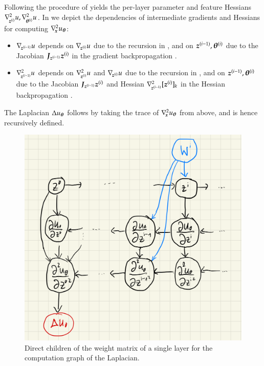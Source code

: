 Following the procedure of  yields the
per-layer parameter and feature Hessians $\nabla_{\!{{\boldsymbol{z}}^{(i)}}}^{2}u,
\nabla_{\!{{\boldsymbol{\theta}}^{(i)}}}^{2}u$. In  we depict the dependencies of
intermediate gradients and Hessians for computing $\nabla_{\!{{\boldsymbol{x}}}}^{2}u_{{\boldsymbol{\theta}}}$:
\begin{itemize}
\item $\nabla_{\!{{\boldsymbol{z}}^{(i-1)}}}u$ depends on $\nabla_{\!{{\boldsymbol{z}}^{(i)}}}u$ due to the recursion in , and on ${\boldsymbol{z}}^{(i-1)}, {\boldsymbol{\theta}}^{(i)}$ due to the Jacobian ${\boldsymbol{J}}_{{\boldsymbol{z}}^{(i-1)}}{\boldsymbol{z}}^{(i)}$ in the gradient backpropagation .

\item $\nabla_{\!{{\boldsymbol{z}}^{(i-1)}}}^{2}u$ depends on $\nabla_{\!{{\boldsymbol{z}}^{(i)}}}^{2}u$ and $\nabla_{\!{{\boldsymbol{z}}^{(i)}}} u$ due to the recursion in , and on ${\boldsymbol{z}}^{(i-1)}, {\boldsymbol{\theta}}^{(i)}$ due to the Jacobian ${\boldsymbol{J}}_{{\boldsymbol{z}}^{(i-1)}}{\boldsymbol{z}}^{(i)}$ and Hessian $\nabla_{\!{{\boldsymbol{z}}^{(i-1)}}}^{2}[{\boldsymbol{z}}^{(i)}]_k$ in the Hessian backpropagation .
\end{itemize}


The Laplacian $\Delta u_{{\boldsymbol{\theta}}}$ follows by taking the trace of
$\nabla_{\!{{\boldsymbol{x}}}}^{2}u_{{\boldsymbol{\theta}}}$ from above, and is hence recursively defined.

\begin{figure}[t]
  \centering
  \includegraphics[width=0.6\linewidth]{figures/HBP_graph_weight.png}
  \caption{Direct children of the weight matrix of a single layer for the computation graph of the Laplacian.}\label{fig:laplacian-graph-weight}
\end{figure}

